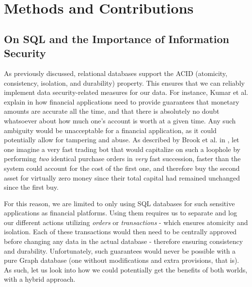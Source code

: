 \documentclass[10pt,        %
               a4paper,     %
               journal,     %
               ]{IEEEtran}
\begin{document}
\section{Methods and Contributions}
\subsection{On SQL and the Importance of Information Security}

As previously discussed, relational databases support the ACID (atomicity, consistency, isolation, and durability) property. This ensures that we can reliably implement data security-related measures for our data. For instance, Kumar et al. explain in \cite{nosql_db_sec} how financial applications need to provide guarantees that monetary amounts are accurate all the time, and that there is absolutely no doubt whatsoever about how much one's account is worth at a given time. Any such ambiguity would be unacceptable for a financial application, as it could potentially allow for tampering and abuse. As described by Brook et al. in \cite{brook_hf_trading}, let one imagine a very fast trading bot that would capitalize on such a loophole by performing \textit{two} identical purchase orders in \textit{very} fast succession, faster than the system could account for the cost of the first one, and therefore buy the second asset for virtually zero money since their total capital had remained unchanged since the first buy. \par
For this reason, we are limited to only using SQL databases for such sensitive applications as financial platforms. Using them requires us to separate and log our different actions utilizing \textit{orders} or \textit{transactions} - which ensures atomicity and isolation. Each of these transactions would then need to be centrally approved before changing any data in the actual database - therefore ensuring consistency and durability. Unfortunately, such guarantees would never be possible with a pure Graph database (one without modifications and extra provisions, that is). As such, let us look into how we could potentially get the benefits of both worlds, with a hybrid approach.\par
\end{document}
